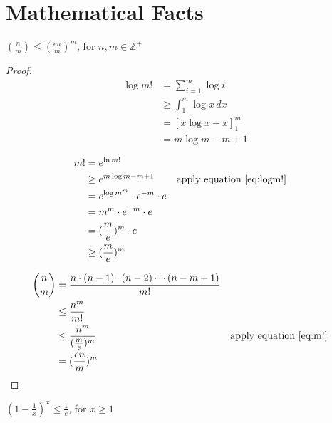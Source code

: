 \chapter{Mathematical Facts}

\begin{lemma}
\label{lemma:nchoosem}

$\binom{n}{m} \le (\frac{en}{m})^m$, for $n, m \in \mathbb{Z}^+$

\end{lemma}

\begin{proof}
\begin{align}
\log m! 
    &= \sum_{i=1}^{m} \log i \nonumber \\
    &\ge \int_1^m \log x \, dx \nonumber \\
    &= [x \log x - x]_1^m \nonumber \\
    &= m \log m - m + 1 \label{eq:logm!}
\end{align}

\begin{align}
m! 
    &= e^{\ln m!} \nonumber \\
    &\ge e^{m \log m - m + 1} \nonumber 
    && \text{apply equation \ref{eq:logm!}} \\
    &= e^{\log m^m} \cdot e^{-m} \cdot e \nonumber \\
    &= m^m \cdot e^{-m} \cdot e \nonumber \\
    &= (\frac{m}{e})^m \cdot e \nonumber \\
    &\ge (\frac{m}{e})^m \label{eq:m!}
\end{align}


\begin{align}
\binom{n}{m} 
    &= \frac{n \cdot (n-1) \cdot (n-2) \cdots (n-m+1)}{m!} \nonumber \\
    &\le \frac{n^m}{m!} \nonumber \\
    &\le \frac{n^m}{(\frac{m}{e})^m} \nonumber 
    && \text{apply equation \ref{eq:m!}} \\
    &= (\frac{en}{m})^m
\end{align}

\end{proof}

\begin{lemma}
\label{lemma:(1-1x)x}

$(1 - \frac{1}{x})^x \le \frac{1}{e}$, for $x \ge 1$

\end{lemma}

